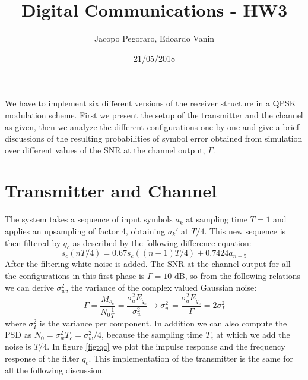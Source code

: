 \documentclass[a4paper,11.5pt]{article}
\title{Digital Communications - HW3}
\author{Jacopo Pegoraro, Edoardo Vanin}
\date{21/05/2018}
\begin{document}
\maketitle

We have to implement six different versions of the receiver structure in a QPSK modulation scheme. First we present the setup of the transmitter and the channel as given, then we analyze the different configurations one by one and give a brief discussions of the resulting probabilities of symbol error obtained from simulation over different values of the SNR at the channel output, $\Gamma$. 

\section*{Transmitter and Channel}

The system takes a sequence of input symbols $a_k$ at sampling time $T=1$ and applies an upsampling of factor 4, obtaining $a_k'$ at $T/4$. This new sequence is then filtered by $q_c$ as described by the following difference equation:
\begin{equation}
s_c(nT/4) = 0.67 s_c((n-1)T/4) + 0.7424 a_{n-5}
\end{equation}
After the filtering white noise is added. The SNR at the channel output for all the configurations in this first phase is $\Gamma = 10$ dB, so from the following relations we can derive $\sigma_w^2$, the variance of the complex valued Gaussian noise:
\begin{equation}
\Gamma = \frac{M_{s_c}}{N_0\frac{1}{T}} = \frac{\sigma_a^2 E_{q_c}}{\sigma_w^2} \longrightarrow \sigma_w^2 = \frac{\sigma_a^2 E_{q_c}}{\Gamma} = 2\sigma_I^2
\end{equation}
where $\sigma_I^2$ is the variance per component. In addition we can also compute the PSD as $N_0=\sigma_w^2 T_c=\sigma_w^2/4$, because the sampling time $T_c$ at which we add the noise is $T/4$.
In figure \ref{fig:qc} we plot the impulse response and the frequency response of the filter $q_c$.
This implementation of the transmitter is the same for all the following discussion.
\end{document}
